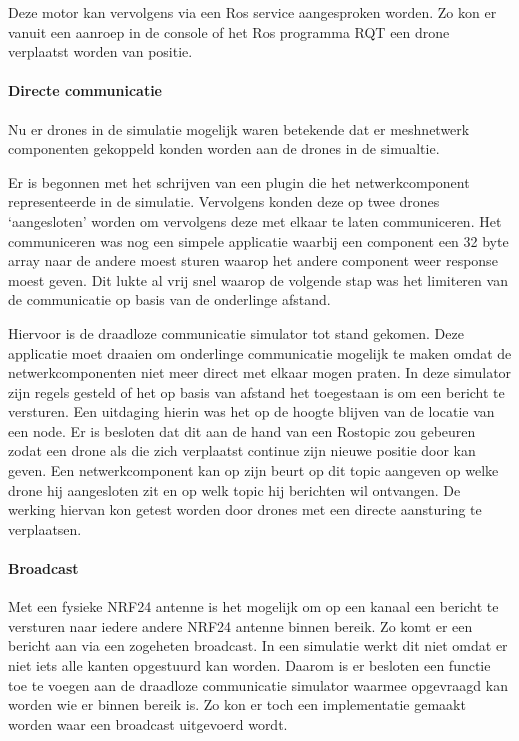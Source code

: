 \documentclass[a4paper, 11pt, oneside]{report}
\begin{document}
Deze motor kan vervolgens via een Ros service aangesproken worden. Zo kon er vanuit een aanroep in de console of het Ros programma RQT een drone verplaatst worden van positie. 

\paragraph{Directe communicatie}
Nu er drones in de simulatie mogelijk waren betekende dat er meshnetwerk componenten gekoppeld konden worden aan de drones in de simualtie.

Er is begonnen met het schrijven van een plugin die het netwerkcomponent representeerde in de simulatie. 
Vervolgens konden deze op twee drones `aangesloten' worden om vervolgens deze met elkaar te laten communiceren.
Het communiceren was nog een simpele applicatie waarbij een component een 32 byte array naar de andere moest sturen waarop het andere component weer response moest geven.
Dit lukte al vrij snel waarop de volgende stap was het limiteren van de communicatie op basis van de onderlinge afstand.

Hiervoor is de draadloze communicatie simulator tot stand gekomen. 
Deze applicatie moet draaien om onderlinge communicatie mogelijk te maken omdat de netwerkcomponenten niet meer direct met elkaar mogen praten.
In deze simulator zijn regels gesteld of het op basis van afstand het toegestaan is om een bericht te versturen.
Een uitdaging hierin was het op de hoogte blijven van de locatie van een node. 
Er is besloten dat dit aan de hand van een Rostopic zou gebeuren zodat een drone als die zich verplaatst continue zijn nieuwe positie door kan geven.
Een netwerkcomponent kan op zijn beurt op dit topic aangeven op welke drone hij aangesloten zit en op welk topic hij berichten wil ontvangen. De werking hiervan kon getest worden door drones met een directe aansturing te verplaatsen.

\paragraph{Broadcast}
Met een fysieke NRF24 antenne is het mogelijk om op een kanaal een bericht te versturen naar iedere andere NRF24 antenne binnen bereik.
Zo komt er een bericht aan via een zogeheten broadcast. 
In een simulatie werkt dit niet omdat er niet iets alle kanten opgestuurd kan worden.
Daarom is er besloten een functie toe te voegen aan de draadloze communicatie simulator waarmee opgevraagd kan worden wie er binnen bereik is.
Zo kon er toch een implementatie gemaakt worden waar een broadcast uitgevoerd wordt.
\end{document}
